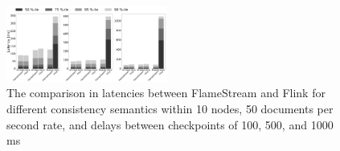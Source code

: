 \begin{figure}[htbp]
  \centering
  \includegraphics[width=0.47\textwidth]{pics/comparison}
  \caption{The comparison in latencies between FlameStream and Flink for different consistency semantics within 10 nodes, 50 documents per second rate, and delays between checkpoints of 100, 500, and 1000 ms}
  \label {performance}
\end{figure}